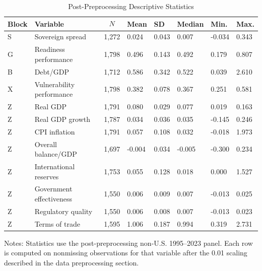 \begin{table}[H]\centering
\begin{threeparttable}
\caption{Post-Preprocessing Descriptive Statistics}
\label{tab:preprocessed_descriptive_stats}
\scriptsize
\begin{tabularx}{\textwidth}{llYYYYYY}
\toprule
Block & Variable & $$N$$ & Mean & SD & Median & Min. & Max. \\
\midrule
S & Sovereign spread & 1,272 & 0.024 & 0.043 & 0.007 & -0.034 & 0.343 \\
G & Readiness performance & 1,798 & 0.496 & 0.143 & 0.492 & 0.179 & 0.807 \\
B & Debt/GDP & 1,712 & 0.586 & 0.342 & 0.522 & 0.039 & 2.610 \\
X & Vulnerability performance & 1,798 & 0.382 & 0.078 & 0.367 & 0.251 & 0.581 \\
Z & Real GDP & 1,791 & 0.080 & 0.029 & 0.077 & 0.019 & 0.163 \\
Z & Real GDP growth & 1,787 & 0.034 & 0.036 & 0.035 & -0.145 & 0.246 \\
Z & CPI inflation & 1,791 & 0.057 & 0.108 & 0.032 & -0.018 & 1.973 \\
Z & Overall balance/GDP & 1,697 & -0.004 & 0.034 & -0.005 & -0.300 & 0.234 \\
Z & International reserves & 1,753 & 0.055 & 0.128 & 0.018 & 0.000 & 1.527 \\
Z & Government effectiveness & 1,550 & 0.006 & 0.009 & 0.007 & -0.013 & 0.025 \\
Z & Regulatory quality & 1,550 & 0.006 & 0.008 & 0.007 & -0.013 & 0.023 \\
Z & Terms of trade & 1,595 & 1.006 & 0.187 & 0.994 & 0.319 & 2.731 \\
\bottomrule
\end{tabularx}
\begin{tablenotes}[flushleft]\footnotesize
\item Notes: Statistics use the post-preprocessing non-U.S. 1995--2023 panel. Each row is computed on nonmissing observations for that variable after the 0.01 scaling described in the data preprocessing section.
\end{tablenotes}
\end{threeparttable}
\end{table}
